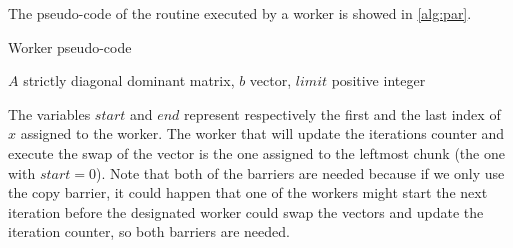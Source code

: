 \documentclass[12pt]{article}
\begin{document}
	The pseudo-code of the routine executed by a worker is showed in \ref{alg:par}.
	\begin{algorithm}[H]
		\caption{Worker pseudo-code}\label{alg:par}
		\begin{algorithmic}[1]
			\Require $A$ strictly diagonal dominant matrix, $b$ vector, $limit$ positive integer
			\EndIf
			\EndFor
			\EndFor
			\EndIf
			\EndWhile
		\end{algorithmic}
	\end{algorithm}
	\noindent The variables $start$ and $end$ represent respectively the first and the last index of $x$ assigned to the worker. The worker that will update the iterations counter and execute the swap of the vector is the one assigned to the leftmost chunk (the one with $start = 0$). Note that both of the barriers are needed because if we only use the copy barrier, it could happen that one of the workers might start the next iteration before the designated worker could swap the vectors and update the iteration counter, so both barriers are needed. 
	
	
\end{document}
